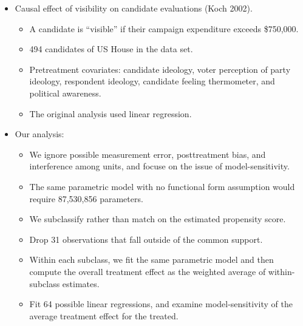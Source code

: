 \documentclass[20pt,landscape,pdftex]{foils}
\begin{document}
\begin{itemize}
\item Causal effect of visibility on candidate evaluations (Koch
  2002).\pause
  \begin{itemize}
  \item A candidate is ``visible'' if their campaign expenditure exceeds
    \$750,000.\pause
  \item 494 candidates of US House in the data set.\pause
  \item Pretreatment covariates: candidate ideology, voter perception
    of party ideology, respondent ideology, candidate feeling
    thermometer, and political awareness.\pause
  \item The original analysis used linear regression.\pause
  \end{itemize}

\item Our analysis:
  \begin{itemize}
  \item We ignore possible measurement error, posttreatment bias, and
    interference among units, and focuse on the issue of
    model-sensitivity.\pause
    
  \item The same parametric model with no functional form assumption
    would require 87,530,856 parameters.\pause  
    
  \item We subclassify rather than match on the estimated propensity
    score.\pause
    
  \item Drop 31 observations that fall outside of the common
    support.\pause
  \item Within each subclass, we fit the same parametric model and
    then compute the overall treatment effect as the weighted average
    of within-subclass estimates.\pause
    
  \item Fit 64 possible linear regressions, and examine
    model-sensitivity of the average treatment effect for the treated.\pause
  \end{itemize}
\end{itemize}



\hypersetup{pdfpagetransition=Replace}
\end{document}
